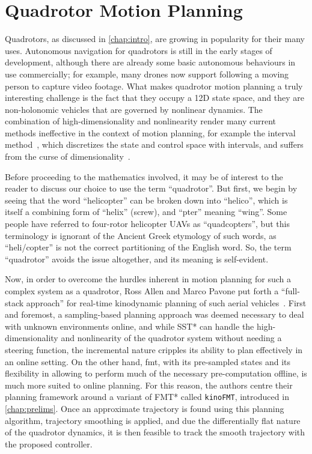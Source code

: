 
\chapter{Quadrotor Motion Planning}\label{chap:quad}

Quadrotors, as discussed in \autoref{chap:intro}, are growing in popularity for their many uses. Autonomous navigation for quadrotors is still in the early stages of development, although there are already some basic autonomous behaviours in use commercially; for example, many drones now support following a moving person to capture video footage. What makes quadrotor motion planning a truly interesting challenge is the fact that they occupy a 12D state space, and they are non-holonomic vehicles that are governed by nonlinear dynamics. The combination of high-dimensionality and nonlinearity render many current methods ineffective in the context of motion planning, for example the interval method~\cite{jaulin2001,Li2018}, which discretizes the state and control space with intervals, and suffers from the curse of dimensionality~\cite{Indyk1998}.

Before proceeding to the mathematics involved, it may be of interest to the reader to discuss our choice to use the term ``quadrotor''. But first, we begin by seeing that the word ``helicopter'' can be broken down into ``helico'', which is itself a combining form of ``helix'' (screw), and ``pter'' meaning ``wing''. Some people have referred to four-rotor helicopter UAVs as ``quadcopters'', but this terminology is ignorant of the Ancient Greek etymology of such words, as ``heli/copter'' is not the correct partitioning of the English word. So, the term ``quadrotor'' avoids the issue altogether, and its meaning is self-evident.

Now, in order to overcome the hurdles inherent in motion planning for such a complex system as a quadrotor, Ross Allen and Marco Pavone put forth a ``full-stack approach'' for real-time kinodynamic planning of such aerial vehicles~\cite{Allen2016}. First and foremost, a sampling-based planning approach was deemed necessary to deal with unknown environments online, and while SST* can handle the high-dimensionality and nonlinearity of the quadrotor system without needing a steering function, the incremental nature cripples its ability to plan effectively in an online setting. On the other hand, \gls{fmt}, with its pre-sampled states and its flexibility in allowing to perform much of the necessary pre-computation offline, is much more suited to online planning. For this reason, the authors centre their planning framework around a variant of FMT* called \texttt{kinoFMT}, introduced in \autoref{chap:prelims}. Once an approximate trajectory is found using this planning algorithm, trajectory smoothing is applied, and due the differentially flat nature of the quadrotor dynamics, it is then feasible to track the smooth trajectory with the proposed controller.

